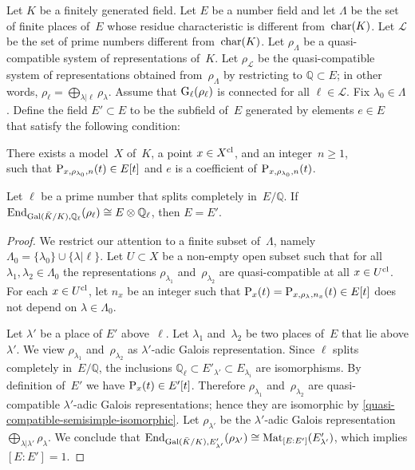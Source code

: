 \documentclass[10pt,twoside,leqno]{article}
\numberwithin{equation}{subsection}
\newcommand{\End}{\textnormal{End}}
\newcommand{\Mat}{\textnormal{Mat}}
\newcommand{\QQ}{\mathbb{Q}}
\newcommand{\QQl}{\QQ_{\ell}}
\newcommand{\primes}{\mathscr{L}}
\newcommand{\Gal}{\textnormal{Gal}}
\newcommand{\cl}{\textnormal{cl}}
\newcommand{\GG}{\textnormal{G}}
\newcommand{\Gl}{\GG_{\ell}}
\newcommand{\chrc}{\textnormal{char}}
\begin{document}
\begin{proposition} %
 \label{recover-endomorphisms}
 Let $K$ be a finitely generated field.
 Let $E$ be a number field
 and let $\Lambda$ be the set of finite places of~$E$
 whose residue characteristic is different from~$\chrc(K)$.
 \def\primes{\mathscr{L}}%
 Let $\primes$ be the set of prime numbers different from~$\chrc(K)$.
 Let $\rho_\Lambda$ be a quasi-compatible system of representations of~$K$.
 Let $\rho_\primes$ be the quasi-compatible system of representations
obtained from~$\rho_\Lambda$ by restricting to $\QQ \subset E$;
 in other words, $\rho_\ell = \bigoplus_{\lambda | \ell} \rho_\lambda$.
 Assume that $\Gl(\rho_\ell)$ is connected for all $\ell \in \primes$.
 Fix $\lambda_0 \in \Lambda$.
 Define the field $E' \subset E$ to be the
 subfield of~$E$ generated by elements $e \in E$
 that satisfy the following condition:

 {\narrower\noindent
  There exists a model~$X$ of~$K$,
  a point $x \in X^\cl$,
  and an integer~$n \ge 1$,\\
  such that $\mathrm{P}_{x,\rho_{\lambda_0},n}(t) \in E[t]$
  and $e$ is a coefficient of $\mathrm{P}_{x,\rho_{\lambda_0},n}(t)$.
  \par}

 \noindent
 Let $\ell$ be a prime number that splits completely in~$E/\QQ$.
 If $\End_{\Gal(\bar{K}/K),\QQl}(\rho_\ell) \cong E \otimes \QQl$,
 then $E = E'$.
 \begin{proof}
  We restrict our attention to a finite subset of~$\Lambda$,
  namely $\Lambda_0 = \{\lambda_0\} \cup \{ \lambda | \ell \}$.
  Let $U \subset X$ be a non-empty open subset such that
  for all $\lambda_1, \lambda_2 \in \Lambda_0$
  the representations
  $\rho_{\lambda_1}$ and~$\rho_{\lambda_2}$
  are quasi-compatible at all $x \in U^\cl$.
  For each $x \in U^\cl$,
  let $n_x$ be an integer such that
  $\mathrm{P}_x(t) = \mathrm{P}_{x,\rho_\lambda,n_x}(t) \in E[t]$
  does not depend on $\lambda \in \Lambda_0$.

  Let $\lambda'$ be a place of $E'$ above~$\ell$.
  Let $\lambda_1$ and~$\lambda_2$ be two places
  of~$E$ that lie above $\lambda'$.
  We view $\rho_{\lambda_1}$ and~$\rho_{\lambda_2}$
  as $\lambda'$-adic Galois representation.
  Since $\ell$ splits completely in~$E/\QQ$,
  the inclusions $\QQl \subset E'_{\lambda'} \subset E_{\lambda_i}$
  are isomorphisms.
  By definition of~$E'$ we have $\mathrm{P}_x(t) \in E'[t]$.
  Therefore $\rho_{\lambda_1}$ and~$\rho_{\lambda_2}$
  are quasi-compatible $\lambda'$-adic Galois representations;
  hence they are isomorphic by \cref{quasi-compatible-semisimple-isomorphic}.
  Let $\rho_{\lambda'}$ be the $\lambda'$-adic Galois representation
  $\bigoplus_{\lambda | \lambda'} \rho_\lambda$.
  We conclude that
  $\End_{\Gal(\bar{K}/K),E'_{\lambda'}}(\rho_{\lambda'})
   \cong \Mat_{[E:E']}(E'_{\lambda'})$,
  which implies $[E:E'] = 1$.
 \end{proof}
\end{proposition}
\end{document}

